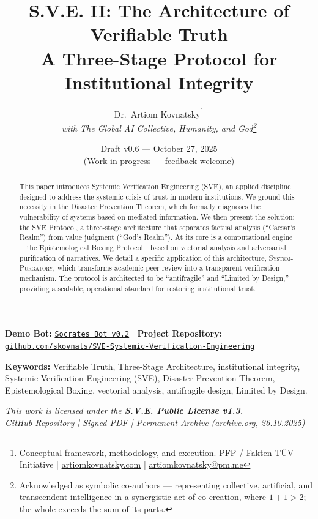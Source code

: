 \documentclass[11pt,a4paper]{article}
\title{\textbf{S.V.E. II: The Architecture of Verifiable Truth}\\[0.5em]
\large A Three-Stage Protocol for Institutional Integrity}
\author{
  Dr.\ Artiom Kovnatsky\thanks{Conceptual framework, methodology, and execution. 
  \href{http://www.pfp24.de}{PFP} / 
  \href{http://www.fakten-tuev.de}{Fakten-TÜV} Initiative \;|\;
  \href{https://www.artiomkovnatsky.com/}{artiomkovnatsky.com} \;|\;
  \href{mailto:artiomkovnatsky@pm.me}{artiomkovnatsky@pm.me}}\\
  \textit{with The Global AI Collective, Humanity, and God\footnote{Acknowledged as symbolic co-authors — representing collective, artificial, and transcendent intelligence in a synergistic act of co-creation, where $1 + 1 > 2$; the whole exceeds the sum of its parts.}}
}
\date{Draft v0.6 — October 27, 2025\\
\small (Work in progress — feedback welcome)}
\theoremstyle{definition}
\begin{document}
\maketitle
\vspace{-1em}
\begin{center}
    {\small 
    \textbf{Demo Bot:} 
    \href{https://chatgpt.com/g/g-68f1fc9848948191a1cc038db8e3422b-sokrat-socrates-bot-v0-2}
    {\texttt{Socrates Bot v0.2}} 
    \quad|\quad
    \textbf{Project Repository:} 
    \href{https://codeberg.org/skovnats/SVE-Systemic-Verification-Engineering}
    {\texttt{github.com/skovnats/SVE-Systemic-Verification-Engineering}}}
\end{center}
\vspace{1em}
\thispagestyle{empty}


\begin{abstract}
\noindent This paper introduces Systemic Verification Engineering (SVE), an applied discipline designed to address the systemic crisis of trust in modern institutions. We ground this necessity in the Disaster Prevention Theorem, which formally diagnoses the vulnerability of systems based on mediated information. We then present the solution: the SVE Protocol, a three-stage architecture that separates factual analysis (``Caesar's Realm'') from value judgment (``God's Realm''). At its core is a computational engine---the Epistemological Boxing Protocol---based on vectorial analysis and adversarial purification of narratives. We detail a specific application of this architecture, \textsc{System-Purgatory}, which transforms academic peer review into a transparent verification mechanism. The protocol is architected to be ``antifragile'' and ``Limited by Design,'' providing a scalable, operational standard for restoring institutional trust.
\end{abstract}

\noindent\textbf{Keywords:} Verifiable Truth, Three-Stage Architecture, institutional integrity, Systemic Verification Engineering (SVE), Disaster Prevention Theorem, Epistemological Boxing, vectorial analysis, antifragile design, Limited by Design.

\vspace{1em}
\begin{center}
\begin{minipage}{0.85\textwidth}
\centering
\itshape\small
This work is licensed under the \textbf{S.V.E. Public License v1.3}.\\[0.3em]
\href{https://codeberg.org/skovnats/SVE-Systemic-Verification-Engineering/tree/master/License/signed}{GitHub Repository}
\quad|\quad
\href{https://codeberg.org/skovnats/SVE-Systemic-Verification-Engineering/src/branch/master/License/signed/_SVE-Systemic-Verification-Engineering_License_SIGNED.pdf}{Signed PDF}
\quad|\quad
\href{https://archive.org/details/sve_public_license_v1.3}{Permanent Archive (archive.org, 26.10.2025)}
\end{minipage}
\end{center}
\vspace{1em}
\end{document}
